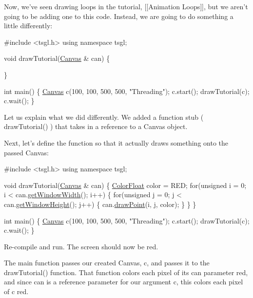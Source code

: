 Now, we've seen drawing loops in the tutorial, \mbox{[}\mbox{[}Animation Loops\mbox{]}\mbox{]}, but we aren't going to be adding one to this code. Instead, we are going to do something a little differently\-:


\begin{DoxyCode}
\textcolor{preprocessor}{#include <tsgl.h>}
\textcolor{keyword}{using namespace }tsgl;

\textcolor{keywordtype}{void} drawTutorial(\hyperlink{classtsgl_1_1_canvas}{Canvas} & can) \{

\}

\textcolor{keywordtype}{int} main() \{
  \hyperlink{classtsgl_1_1_canvas}{Canvas} c(100, 100, 500, 500, \textcolor{stringliteral}{"Threading"});
  c.start();
  drawTutorial(c);
  c.wait();
\}
\end{DoxyCode}


Let us explain what we did differently. We added a function stub ( {\ttfamily draw\-Tutorial()} ) that takes in a reference to a Canvas object.

Next, let's define the function so that it actually draws something onto the passed Canvas\-:


\begin{DoxyCode}
\textcolor{preprocessor}{#include <tsgl.h>}
\textcolor{keyword}{using namespace }tsgl;

\textcolor{keywordtype}{void} drawTutorial(\hyperlink{classtsgl_1_1_canvas}{Canvas} & can) \{
   \hyperlink{structtsgl_1_1_color_float}{ColorFloat} color = RED;
   \textcolor{keywordflow}{for}(\textcolor{keywordtype}{unsigned} i = 0; i < can.\hyperlink{classtsgl_1_1_canvas_a086a0322f4a6ab27da6929b1aa0593af}{getWindowWidth}(); i++) \{
      \textcolor{keywordflow}{for}(\textcolor{keywordtype}{unsigned} j = 0; j < can.\hyperlink{classtsgl_1_1_canvas_ad740ebe5d6bd69ab79cde3e84f369f35}{getWindowHeight}(); j++) \{
         can.\hyperlink{classtsgl_1_1_canvas_a6c17c90cd13f7b0184a25e4acc2b7426}{drawPoint}(i, j, color);
      \}
   \}
\}

\textcolor{keywordtype}{int} main() \{
  \hyperlink{classtsgl_1_1_canvas}{Canvas} c(100, 100, 500, 500, \textcolor{stringliteral}{"Threading"});
  c.start();
  drawTutorial(c);
  c.wait();
\}
\end{DoxyCode}


Re-\/compile and run. The screen should now be red.

The main function passes our created Canvas, {\ttfamily c}, and passes it to the {\ttfamily draw\-Tutorial()} function. That function colors each pixel of its {\ttfamily can} parameter red, and since {\ttfamily can} is a reference parameter for our argument {\ttfamily c}, this colors each pixel of {\ttfamily c} red.

